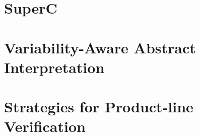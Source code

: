 \documentclass[11pt]{article}
\begin{document}
\section{SuperC}
\cite{Gazzillo:2012}

\section{Variability-Aware Abstract Interpretation}
\cite{Midtgaard:2015}

\section{Strategies for Product-line Verification}
\cite{Apel:2013}


 
\end{document}
